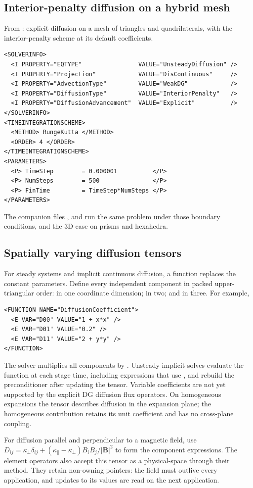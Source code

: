 \subsection*{Interior-penalty diffusion on a hybrid mesh}
From : explicit diffusion on a mesh
of triangles and quadrilaterals, with the interior-penalty scheme at its
default coefficients.
\begin{lstlisting}[style=XmlStyle]
<SOLVERINFO>
  <I PROPERTY="EQTYPE"                VALUE="UnsteadyDiffusion" />
  <I PROPERTY="Projection"            VALUE="DisContinuous"     />
  <I PROPERTY="AdvectionType"         VALUE="WeakDG"            />
  <I PROPERTY="DiffusionType"         VALUE="InteriorPenalty"   />
  <I PROPERTY="DiffusionAdvancement"  VALUE="Explicit"          />
</SOLVERINFO>
<TIMEINTEGRATIONSCHEME>
  <METHOD> RungeKutta </METHOD>
  <ORDER> 4 </ORDER>
</TIMEINTEGRATIONSCHEME>
<PARAMETERS>
  <P> TimeStep        = 0.000001          </P>
  <P> NumSteps        = 500               </P>
  <P> FinTime         = TimeStep*NumSteps </P>
</PARAMETERS>
\end{lstlisting}
The companion files ,  and
 run the same problem under those boundary conditions, and
 the 3D case on prisms and
hexahedra.

\subsection*{Spatially varying diffusion tensors}
For steady systems and implicit continuous diffusion, a
 function replaces the constant 
parameters. Define every independent component in packed upper-triangular
order:  in one coordinate dimension;  in two;
and  in three. For example,
\begin{lstlisting}[style=XmlStyle]
<FUNCTION NAME="DiffusionCoefficient">
  <E VAR="D00" VALUE="1 + x*x" />
  <E VAR="D01" VALUE="0.2" />
  <E VAR="D11" VALUE="2 + y*y" />
</FUNCTION>
\end{lstlisting}
The solver multiplies all components by . Unsteady implicit
solves evaluate the function at each stage time, including expressions that
use , and rebuild the preconditioner after updating the tensor.
Variable coefficients are not yet supported by the explicit DG diffusion
flux operators. On homogeneous expansions the tensor describes diffusion in
the expansion plane; the homogeneous contribution retains its unit
coefficient and has no cross-plane coupling.

For diffusion parallel and perpendicular to a magnetic field, use
$D_{ij}=\kappa_\perp\delta_{ij}+
(\kappa_\parallel-\kappa_\perp)B_i B_j/|\boldsymbol{B}|^2$ to form the
component expressions. The element operators also accept this tensor as a
physical-space  through their  method.
They retain non-owning pointers: the field must outlive every application,
and updates to its values are read on the next application.
